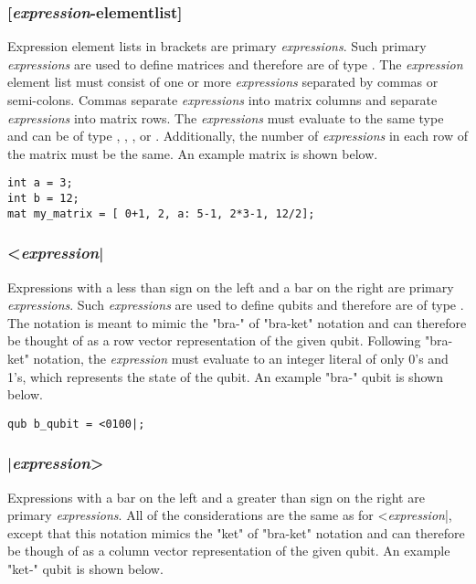 \subsubsection{[\textit{expression}-elementlist]}
Expression element lists in brackets are primary \textit{expressions}. Such primary \textit{expressions} are used to define matrices and therefore are of type \mat. The \textit{expression} element list must consist of one or more \textit{expressions} separated by commas or semi-colons. Commas separate \textit{expressions} into matrix columns and  separate \textit{expressions} into matrix rows. The \textit{expressions} must evaluate to the same type and can be of type \integ, \float, \complex, or \mat. Additionally, the number of \textit{expressions} in each row of the matrix must be the same. An example matrix is shown below.

\begin{lstlisting}
int a = 3;
int b = 12;
mat my_matrix = [ 0+1, 2, a: 5-1, 2*3-1, 12/2];
\end{lstlisting}

\subsubsection{<\textit{expression}|}
Expressions with a less than sign on the left and a bar on the right are primary \textit{expressions}. Such \textit{expressions} are used to define qubits and therefore are of type \qubit. The notation is meant to mimic the "bra-" of "bra-ket" notation and can therefore be thought of as a row vector representation of the given qubit. Following "bra-ket" notation, the \textit{expression} must evaluate  to an integer literal of only 0's and 1's, which represents the state of the qubit. An example "bra-" qubit is shown below.

\begin{lstlisting}
qub b_qubit = <0100|;
\end{lstlisting}

\subsubsection{|\textit{expression}>}
Expressions with a bar on the left and a greater than sign on the right are primary \textit{expressions}. All of the considerations are the same as for <\textit{expression}|, except that this notation mimics the "ket" of "bra-ket" notation and can therefore be though of as a column vector representation of the given qubit. An example "ket-" qubit is shown below.

